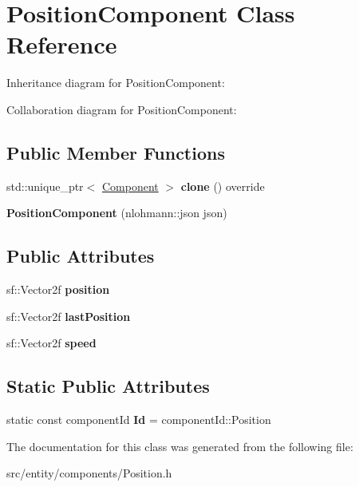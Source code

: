 \hypertarget{classPositionComponent}{\section{Position\-Component Class Reference}
\label{classPositionComponent}
}


Inheritance diagram for Position\-Component\-:


Collaboration diagram for Position\-Component\-:
\subsection*{Public Member Functions}
\begin{DoxyCompactItemize}
\item 
\hypertarget{classPositionComponent_ae04209639f07bee7be1fef2731262851}{std\-::unique\-\_\-ptr$<$ \hyperlink{classComponent}{Component} $>$ {\bfseries clone} () override}\label{classPositionComponent_ae04209639f07bee7be1fef2731262851}

\item 
\hypertarget{classPositionComponent_ab884ac96dc85424de2adb3423a76cc95}{{\bfseries Position\-Component} (nlohmann\-::json json)}\label{classPositionComponent_ab884ac96dc85424de2adb3423a76cc95}

\end{DoxyCompactItemize}
\subsection*{Public Attributes}
\begin{DoxyCompactItemize}
\item 
\hypertarget{classPositionComponent_a98149921fa43d0c82e6a79a3b96cbfef}{sf\-::\-Vector2f {\bfseries position}}\label{classPositionComponent_a98149921fa43d0c82e6a79a3b96cbfef}

\item 
\hypertarget{classPositionComponent_ada7eda72ac5839af96457c6764a468c7}{sf\-::\-Vector2f {\bfseries last\-Position}}\label{classPositionComponent_ada7eda72ac5839af96457c6764a468c7}

\item 
\hypertarget{classPositionComponent_aa9ce8cff0358ee1befbf9695aa3d7ab4}{sf\-::\-Vector2f {\bfseries speed}}\label{classPositionComponent_aa9ce8cff0358ee1befbf9695aa3d7ab4}

\end{DoxyCompactItemize}
\subsection*{Static Public Attributes}
\begin{DoxyCompactItemize}
\item 
\hypertarget{classPositionComponent_a8eb32e3b88cfbd10e1837baed9ba71c6}{static const component\-Id {\bfseries Id} = component\-Id\-::\-Position}\label{classPositionComponent_a8eb32e3b88cfbd10e1837baed9ba71c6}

\end{DoxyCompactItemize}


The documentation for this class was generated from the following file\-:\begin{DoxyCompactItemize}
\item 
src/entity/components/Position.\-h\end{DoxyCompactItemize}
